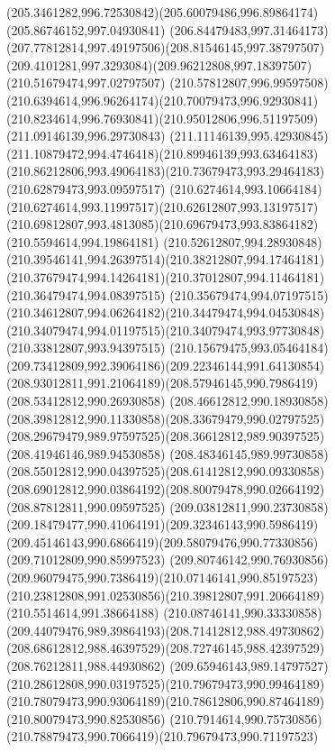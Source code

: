 {    \curveto(205.3461282,996.72530842)(205.60079486,996.89864174)(205.86746152,997.04930841)
    \curveto(206.84479483,997.31464173)(207.77812814,997.49197506)(208.81546145,997.38797507)
    \curveto(209.4101281,997.3293084)(209.96212808,997.18397507)(210.51679474,997.02797507)
    \curveto(210.57812807,996.99597508)(210.6394614,996.96264174)(210.70079473,996.92930841)
    \curveto(210.8234614,996.76930841)(210.95012806,996.51197509)(211.09146139,996.29730843)
    \curveto(211.11146139,995.42930845)(211.10879472,994.4746418)(210.89946139,993.63464183)
    \curveto(210.86212806,993.49064183)(210.73679473,993.29464183)(210.62879473,993.09597517)
    \curveto(210.6274614,993.10664184)(210.6274614,993.11997517)(210.62612807,993.13197517)
    \curveto(210.69812807,993.4813085)(210.69679473,993.83864182)(210.5594614,994.19864181)
    \curveto(210.52612807,994.28930848)(210.39546141,994.26397514)(210.38212807,994.17464181)
    \curveto(210.37679474,994.14264181)(210.37012807,994.11464181)(210.36479474,994.08397515)
    \curveto(210.35679474,994.07197515)(210.34612807,994.06264182)(210.34479474,994.04530848)
    \curveto(210.34079474,994.01197515)(210.34079474,993.97730848)(210.33812807,993.94397515)
    \curveto(210.15679475,993.05464184)(209.73412809,992.39064186)(209.22346144,991.64130854)
    \curveto(208.93012811,991.21064189)(208.57946145,990.7986419)(208.53412812,990.26930858)
    \curveto(208.46612812,990.18930858)(208.39812812,990.11330858)(208.33679479,990.02797525)
    \curveto(208.29679479,989.97597525)(208.36612812,989.90397525)(208.41946146,989.94530858)
    \curveto(208.48346145,989.99730858)(208.55012812,990.04397525)(208.61412812,990.09330858)
    \curveto(208.69012812,990.03864192)(208.80079478,990.02664192)(208.87812811,990.09597525)
    \curveto(209.03812811,990.23730858)(209.18479477,990.41064191)(209.32346143,990.5986419)
    \curveto(209.45146143,990.6866419)(209.58079476,990.77330856)(209.71012809,990.85997523)
    \curveto(209.80746142,990.76930856)(209.96079475,990.7386419)(210.07146141,990.85197523)
    \curveto(210.23812808,991.02530856)(210.39812807,991.20664189)(210.5514614,991.38664188)
    \curveto(210.08746141,990.33330858)(209.44079476,989.39864193)(208.71412812,988.49730862)
    \curveto(208.68612812,988.46397529)(208.72746145,988.42397529)(208.76212811,988.44930862)
    \curveto(209.65946143,989.14797527)(210.28612808,990.03197525)(210.79679473,990.99464189)
    \curveto(210.78079473,990.93064189)(210.78612806,990.87464189)(210.80079473,990.82530856)
    \curveto(210.7914614,990.75730856)(210.78879473,990.7066419)(210.79679473,990.71197523)
}
